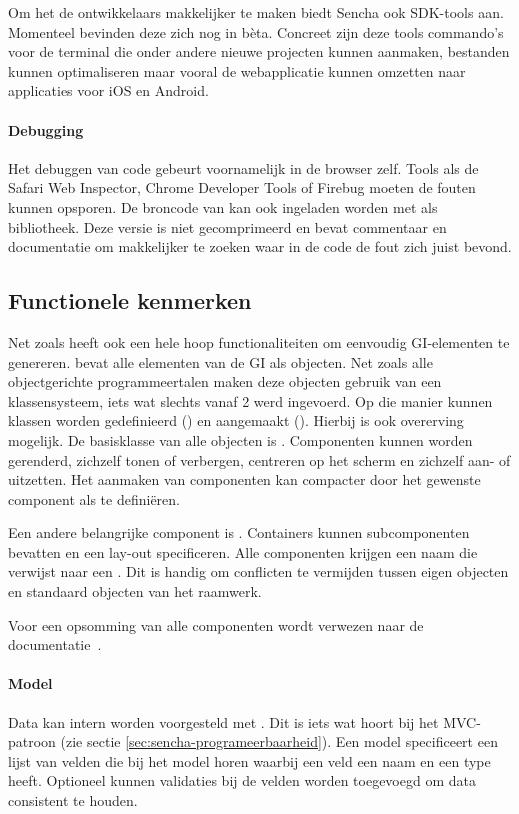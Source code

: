 Om het de ontwikkelaars makkelijker te maken biedt Sencha ook SDK-tools aan.  
Momenteel bevinden deze zich nog in bèta.  
Concreet zijn deze tools commando's voor de terminal die onder andere nieuwe projecten kunnen aanmaken, \js{} bestanden kunnen optimaliseren maar vooral de webapplicatie kunnen omzetten naar  applicaties voor iOS en Android.

\paragraph{Debugging}
Het debuggen van code gebeurt voornamelijk in de browser zelf.  
Tools als de Safari Web Inspector,  Chrome Developer Tools of Firebug moeten de fouten kunnen opsporen.  
De broncode van \st{} kan ook ingeladen worden met  als bibliotheek.  
Deze versie is niet gecomprimeerd en bevat commentaar en documentatie om makkelijker te zoeken waar in de code de fout zich juist bevond.

\subsection{Functionele kenmerken}
Net zoals \jqm{} heeft \st{} ook een hele hoop functionaliteiten om eenvoudig GI-elementen te genereren.  
\st{} bevat alle elementen van de GI als \js{} objecten.  
Net zoals alle objectgerichte programmeertalen maken deze objecten gebruik van een klassensysteem,  iets wat slechts vanaf \st{} 2 werd ingevoerd.  
Op die manier kunnen klassen worden gedefinieerd () en aangemaakt ().  
Hierbij is ook overerving mogelijk.  
De basisklasse van alle objecten is .  
Componenten kunnen worden gerenderd, zichzelf tonen of verbergen,  centreren op het scherm en zichzelf aan- of uitzetten.   
Het aanmaken van componenten kan compacter door het gewenste component als  te definiëren.  

Een andere belangrijke component is .  
Containers kunnen subcomponenten bevatten en een lay-out specificeren.  
Alle componenten krijgen een naam die verwijst naar een .  
Dit is handig om conflicten te vermijden tussen eigen objecten en standaard objecten van het raamwerk.  

Voor een opsomming van alle componenten wordt verwezen naar de documentatie~\cite{Inc.2013a}.

\paragraph{Model}
Data kan intern worden voorgesteld met .  
Dit is iets wat hoort bij het MVC-patroon (zie sectie \ref{sec:sencha-programeerbaarheid}).  
Een model specificeert een lijst van velden die bij het model horen waarbij een veld een naam en een type heeft.  
Optioneel kunnen validaties bij de velden worden toegevoegd om data consistent te houden.  

